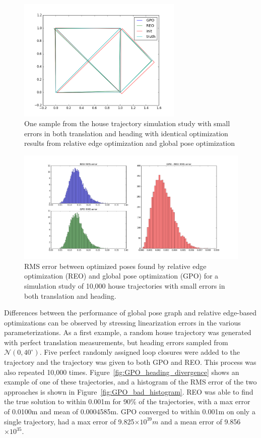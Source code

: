 \begin{figure}
  \includegraphics[width=0.7\textwidth]{figures/house_trajectory.png}
  \caption{One sample from the house trajectory simulation study with small errors in both translation and heading with identical optimization results from relative edge optimization and global pose optimization}
  \label{fig:house_trajectory}
\end{figure}

\begin{figure}[H]
  \includegraphics[width=\textwidth]{figures/REO_vs_GPO_good.png}
  \caption{RMS error between optimized poses found by relative edge optimization (REO) and global pose optimization (GPO) for a simulation study of 10,000 house trajectories with small errors in both translation and heading.}
  \label{fig:convergence_house}
\end{figure}

Differences between the performance of global pose graph and relative edge-based optimizations can be observed by stressing linearization errors in the various parameterizations.  As a first example, a random house trajectory was generated with perfect translation measurements, but heading errors sampled from $\mathcal{N}(0, 40^\circ)$. Five perfect randomly assigned loop closures were added to the trajectory and the trajectory was given to both GPO and REO.  This process was also repeated 10,000 times.  Figure~\ref{fig:GPO_heading_divergence} shows an example of one of these trajectories, and a histogram of the RMS error of the two approaches is shown in Figure~\ref{fig:GPO_bad_histogram}. REO was able to find the true solution to within 0.001m for 90\% of the trajectories, with a max error of 0.0100m and mean of 0.0004585m.  GPO converged to within 0.001m on only a single trajectory, had a max error of 9.825$\times 10 ^{39}m$ and a mean error of 9.856$\times 10 ^{35}$.

